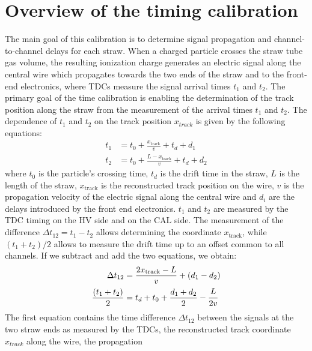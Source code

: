 \section{Overview of the timing calibration}
The main goal of this calibration is to 
determine signal propagation 
and channel-to-channel delays for each straw.
When a charged particle crosses the straw tube 
gas volume, the resulting ionization charge 
generates an electric signal along the central 
wire which propagates towards the two ends of 
the straw and to the front-end electronics, 
where TDCs measure the signal arrival 
times $t_1$ and $t_2$. The primary goal of 
the time calibration is enabling the 
determination of the track position 
along the straw from the measurement of 
the arrival times $t_1$ and $t_2$. 
The dependence of $t_1$ and $t_2$ on the track 
position $x_{track}$ is given by the following equations:
\begin{equation}
\begin{aligned}
    t_1 &= t_0 + \frac{x_{\text{track}}}{v} + t_d + d_1 \\
    t_2 &= t_0 + \frac{L - x_{\text{track}}}{v} + t_d + d_2
\end{aligned}
\end{equation}
where $t_0$ is the particle's crossing time, 
$t_d$ is the drift time in the straw, 
$L$ is the length of the straw, 
$x_{\text{track}}$ is the 
reconstructed track position on the wire, $v$ 
is the propagation velocity of 
the electric signal along the central 
wire and $d_i$ are the delays  
introduced by the front end electronics. 
$t_1$ and $t_2$ are measured  
by the TDC timing on the HV side and on the CAL side.
The measurement of the difference 
$\Delta t_{12}=t_1-t_2$ allows 
determining the coordinate $x_{\text{track}}$, 
while $(t_1 + t_2) / 2$ allows to measure the drift time  
up to an offset common to all channels. 
If we subtract and add the two equations, we obtain:
\begin{equation}\label{ffffff}
    \begin{aligned}
        \Delta t_{12} &= \frac{2x_{\text{track}}-L}{v} +(d_1-d_2)  \\
        \frac{(t_1 + t_2)}{2} &= t_d+t_0+\frac{d_1+d_2}{2}-\cfrac{L}{2v} 
    \end{aligned}
    \end{equation}
The first equation contains the time 
difference $\Delta t_{12}$ between the 
signals at the two straw ends as measured 
by the TDCs, the reconstructed track coordinate 
$x_{track}$ along the wire, the propagation 
